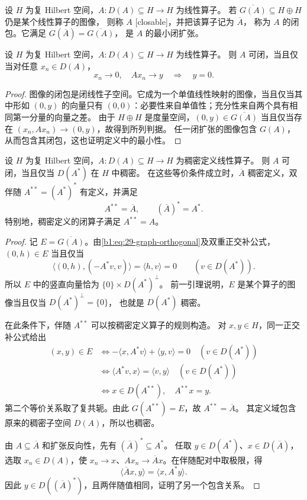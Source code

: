 \begin{definition}[可闭算子与闭包]
\label{b1:def:29-closable}
设 \(H\) 为复 Hilbert 空间，\(A:D(A)\subseteq H\to H\) 为线性算子。
若 \(\overline{G(A)}\subseteq H\oplus H\) 仍是某个线性算子的图像，
则称 \(A\) [closable]，并把该算子记为 \(\overline A\)，
称为 \(A\) 的闭包。它满足 \(G(\overline A)=\overline{G(A)}\)，
是 \(A\) 的最小闭扩张。
\end{definition}

\begin{lemma}[可闭性的序列判别]
\label{b1:lem:29-closable-sequence}
设 \(H\) 为复 Hilbert 空间，\(A:D(A)\subseteq H\to H\) 为线性算子。
则 \(A\) 可闭，当且仅当对任意 \(x_n\in D(A)\)，
\[
 x_n\to0,\quad Ax_n\to y\quad\Longrightarrow\quad y=0.
\]
\end{lemma}
\begin{proof}
图像的闭包是闭线性子空间。它成为一个单值线性映射的图像，当且仅当其中形如 \((0,y)\)
的向量只有 \((0,0)\)：必要性来自单值性；充分性来自两个具有相同第一分量的向量之差。
由于 \(H\oplus H\) 是度量空间，\((0,y)\in\overline{G(A)}\)
当且仅当存在 \((x_n,Ax_n)\to(0,y)\)，故得到所列判据。
任一闭扩张的图像包含 \(G(A)\)，从而包含其闭包，这也证明定义中的最小性。
\end{proof}

\begin{theorem}[可闭性与双伴随]
\label{b1:thm:29-double-adjoint}
设 \(H\) 为复 Hilbert 空间，\(A:D(A)\subseteq H\to H\) 为稠密定义线性算子。
则 \(A\) 可闭，当且仅当 \(D(A^*)\) 在 \(H\) 中稠密。
在这些等价条件成立时，\(\overline A\) 稠密定义，双伴随 \(A^{**}=(A^*)^*\) 有定义，并满足
\[
 A^{**}=\overline A,
 \qquad (\overline A)^*=A^*.
\]
特别地，稠密定义的闭算子满足 \(A^{**}=A\)。
\end{theorem}
\begin{proof}
记 \(E=\overline{G(A)}\)。由\eqref{b1:eq:29-graph-orthogonal}及双重正交补公式，
\((0,h)\in E\) 当且仅当
\[
 \langle(0,h),(-A^*v,v)\rangle=\langle h,v\rangle=0
 \qquad(v\in D(A^*)).
\]
所以 \(E\) 中的竖直向量恰为 \(\{0\}\times D(A^*)^\perp\)。
前一引理说明，\(E\) 是某个算子的图像当且仅当 \(D(A^*)^\perp=\{0\}\)，
也就是 \(D(A^*)\) 稠密。

在此条件下，伴随 \(A^{**}\) 可以按稠密定义算子的规则构造。
对 \(x,y\in H\)，同一正交补公式给出
\[
 \begin{split}
 (x,y)\in E
 &\iff -\langle x,A^*v\rangle+\langle y,v\rangle=0
       \quad(v\in D(A^*))\\
 &\iff \langle A^*v,x\rangle=\langle v,y\rangle
       \quad(v\in D(A^*))\\
 &\iff x\in D(A^{**}),\quad A^{**}x=y.
 \end{split}
\]
第二个等价关系取了复共轭。由此 \(G(A^{**})=E\)，故 \(A^{**}=\overline A\)。
其定义域包含原来的稠密子空间 \(D(A)\)，所以也稠密。

由 \(A\subseteq\overline A\) 和扩张反向性，先有 \((\overline A)^*\subseteq A^*\)。
任取 \(y\in D(A^*)\)、\(x\in D(\overline A)\)，选取 \(x_n\in D(A)\)，使
\(x_n\to x\)、\(Ax_n\to\overline Ax\)。在伴随配对中取极限，得
\[
 \langle\overline Ax,y\rangle=\langle x,A^*y\rangle.
\]
因此 \(y\in D((\overline A)^*)\)，且两伴随值相同，证明了另一个包含关系。
\end{proof}

